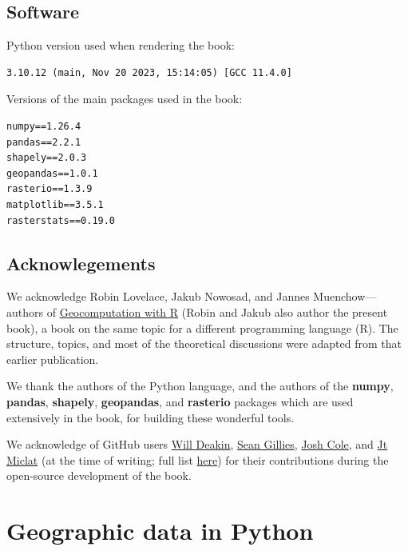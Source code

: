 \documentclass[
  letterpaper,
]{krantz}
\begin{document}
\section*{Software}\label{software}


Python version used when rendering the book:

\begin{verbatim}
3.10.12 (main, Nov 20 2023, 15:14:05) [GCC 11.4.0]
\end{verbatim}

Versions of the main packages used in the book:

\begin{verbatim}
numpy==1.26.4
pandas==2.2.1
shapely==2.0.3
geopandas==1.0.1
rasterio==1.3.9
matplotlib==3.5.1
rasterstats==0.19.0
\end{verbatim}

\section*{Acknowlegements}\label{acknowlegements}


We acknowledge Robin Lovelace, Jakub Nowosad, and Jannes
Muenchow---authors of \href{https://r.geocompx.org/}{Geocomputation with
R} (Robin and Jakub also author the present book), a book on the same
topic for a different programming language (R). The structure, topics,
and most of the theoretical discussions were adapted from that earlier
publication.

We thank the authors of the Python language, and the authors of the
\textbf{numpy}, \textbf{pandas}, \textbf{shapely}, \textbf{geopandas},
and \textbf{rasterio} packages which are used extensively in the book,
for building these wonderful tools.

We acknowledge of GitHub users
\href{https://github.com/anisotropi4}{Will Deakin},
\href{https://github.com/sgillies}{Sean Gillies},
\href{https://github.com/JoshCole-DTA}{Josh Cole}, and
\href{https://github.com/jtmiclat}{Jt Miclat} (at the time of writing;
full list
\href{https://github.com/geocompx/geocompy/graphs/contributors}{here})
for their contributions during the open-source development of the book.


\chapter{Geographic data in Python}\label{sec-spatial-class}
\end{document}
